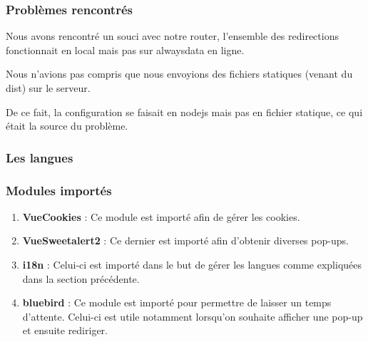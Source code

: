 \newpage
\subsubsection{Problèmes rencontrés}
\begin{flushleft}
Nous avons rencontré un souci avec notre router, l’ensemble des redirections fonctionnait en local mais pas sur alwaysdata en ligne.
\end{flushleft}
\begin{flushleft}
Nous n’avions pas compris que nous envoyions des fichiers statiques (venant du dist) sur le serveur.
\end{flushleft}
\begin{flushleft}
De ce fait, la configuration se faisait en nodejs mais pas en fichier statique, ce qui était la source du problème.
\end{flushleft}

\newpage
\subsubsection{Les langues}

\newpage
\subsubsection{Modules importés}
\begin{enumerate}[-]
\item \textbf{VueCookies} :\newline
Ce module est importé afin de gérer les cookies.
\item \textbf{VueSweetalert2} :\newline
Ce dernier est importé afin d'obtenir diverses pop-ups.
\item \textbf{i18n} :\newline
Celui-ci est importé dans le but de gérer les langues comme expliquées dans la section précédente.
\item \textbf{bluebird} :\newline
Ce module est importé pour permettre de laisser un temps d'attente.\newline
Celui-ci est utile notamment lorsqu'on souhaite afficher une pop-up et ensuite rediriger.
\end{enumerate} 

